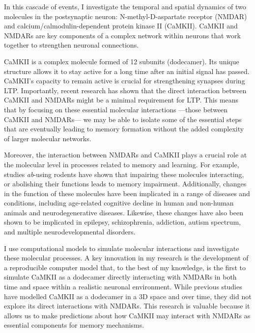 \documentclass[
  11pt,
  letterpaper,
]{scrreprt}
\begin{document}
In this cascade of events, I investigate the temporal and spatial
dynamics of two molecules in the postsynaptic neuron:
N-methyl-D-aspartate receptor (NMDAR) and calcium/calmodulin-dependent
protein kinase II (CaMKII). CaMKII and NMDARs are key components of a
complex network within neurons that work together to strengthen neuronal
connections.

CaMKII is a complex molecule formed of 12 subunits (dodecamer). Its
unique structure allows it to stay active for a long time after an
initial signal has passed. CaMKII's capacity to remain active is crucial
for strengthening synapses during LTP. Importantly, recent research has
shown that the direct interaction between CaMKII and NMDARs might be a
minimal requirement for LTP. This means that by focusing on these
essential molecular interactions ---those between CaMKII and NMDARs---
we may be able to isolate some of the essential steps that are
eventually leading to memory formation without the added complexity of
larger molecular networks.

Moreover, the interaction between NMDARs and CaMKII plays a crucial role
at the molecular level in processes related to memory and learning. For
example, studies \emph{ab}-using rodents have shown that impairing these
molecules interacting, or abolishing their functions leads to memory
impairment. Additionally, changes in the function of these molecules
have been implicated in a range of diseases and conditions, including
age-related cognitive decline in human and non-human animals and
neurodegenerative diseases. Likewise, these changes have also been shown
to be implicated in epilepsy, schizophrenia, addiction, autism spectrum,
and multiple neurodevelopmental disorders.

I use computational models to simulate molecular interactions and
investigate these molecular processes. A key innovation in my research
is the development of a reproducible computer model that, to the best of
my knowledge, is the first to simulate CaMKII as a dodecamer directly
interacting with NMDARs in both time and space within a realistic
neuronal environment. While previous studies have modelled CaMKII as a
dodecamer in a 3D space and over time, they did not explore its direct
interactions with NMDARs. This research is valuable because it allows us
to make predictions about how CaMKII may interact with NMDARs as
essential components for memory mechanisms.
\end{document}
